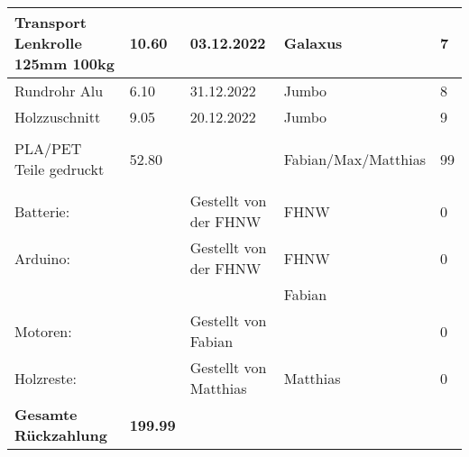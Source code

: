 \begin{table}[H]
{\begin{tabular}{|l|l|l|l|l|}
    Transport   Lenkrolle 125mm 100kg  & 10.60                      & 03.12.2022                & Galaxus             & 7                         \\ \hline
    Rundrohr Alu                       & 6.10                       & 31.12.2022                & Jumbo               & 8                         \\ \hline
    Holzzuschnitt                      & 9.05                       & 20.12.2022                & Jumbo               & 9                         \\ \hline
                                       &                            &                           &                     &                           \\ \hline
    PLA/PET Teile   gedruckt           & 52.80                      &                           & Fabian/Max/Matthias & 99                        \\ \hline
                                       &                            &                           &                     &                           \\ \hline
    Batterie:                          &                            & Gestellt von der FHNW     & FHNW                & 0                         \\ \hline
    Arduino:                           &                            & Gestellt von der FHNW     & FHNW                & 0                         \\ \hline
                                       &                            &                           & Fabian              &                           \\ \hline
    Motoren:                           &                            & Gestellt von Fabian       &                     & 0                         \\ \hline
    Holzreste:                         &                            & Gestellt von Matthias     & Matthias            & 0                         \\ \hline
    \rowcolor[HTML]{C6E0B4} 
    \textbf{Gesamte   Rückzahlung}     & \textbf{199.99}            & \textbf{}                 & \textbf{}           & \textbf{}                 \\ \hline
    \end{tabular}%
    }
    \end{table}